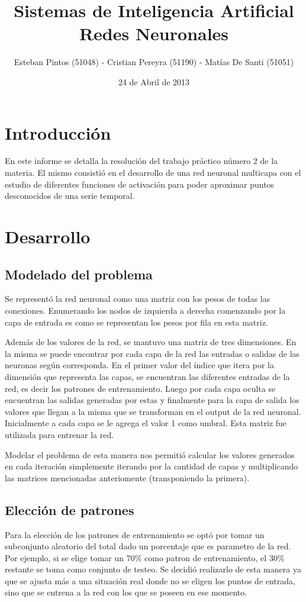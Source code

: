 \documentclass[11pt]{article}
\title{Sistemas de Inteligencia Artificial\\
Redes Neuronales\\}
\author{Esteban Pintos (51048) - Cristian Pereyra (51190) - Matías De Santi (51051)}
\date{24 de Abril de 2013}
\begin{document}
\maketitle

\section{Introducción}
    \par En este informe se detalla la resolución del trabajo práctico número 2 de la materia. El mismo consistió en el desarrollo de una red neuronal multicapa con el estudio de diferentes funciones de activación para poder aproximar puntos desconocidos de una serie temporal.
\section{Desarrollo}
    \subsection{Modelado del problema}
   
    \par Se representó la red neuronal como una matriz con los pesos de todas las conexiones. Enumerando los nodos de izquierda a derecha comenzando por la capa de entrada es como se representan los pesos por fila en esta matriz.
    \par Además de los valores de la red, se mantuvo una  matriz de tres dimensiones. En la misma se puede encontrar por cada capa de la red las entradas o salidas de las neuronas según corresponda. En el primer valor del índice que itera por la dimensión que representa las capas, se encuentran las diferentes entradas de la red, es decir los patrones de entrenamiento. Luego por cada capa oculta se encuentran las salidas generadas por estas y finalmente para la capa de salida los valores que llegan a la misma que se transforman en el output de la red neuronal. Inicialmente a cada capa se le agrega el valor 1 como umbral. Esta matriz fue utilizada para entrenar la red.
    \par Modelar el problema de esta manera nos permitió calcular los valores generados en cada iteración simplemente iterando por la cantidad de capas y multiplicando las matrices mencionadas anteriomente (transponiendo la primera).
    \subsection{Elección de patrones}
    \par Para la elección de los patrones de entrenamiento se optó por tomar un subconjunto aleatorio del total dado un porcentaje que es parametro de la red. Por ejemplo, si se elige tomar un 70\% como patron de entrenamiento, el 30\% restante se toma como conjunto de testeo. Se decidió realizarlo de esta manera ya que se ajusta más a una situación real donde no se eligen los puntos de entrada, sino que se entrena a la red con los que se poseen en ese momento.
\end{document}
